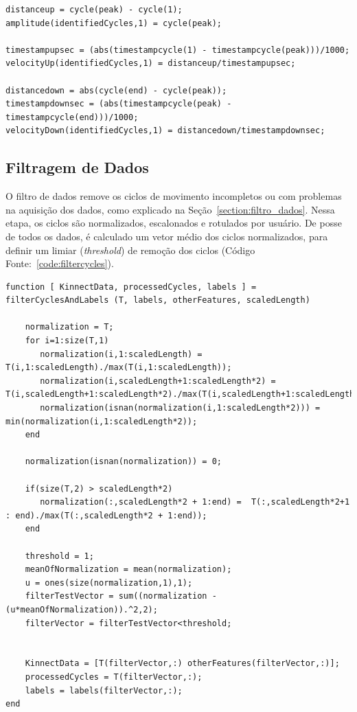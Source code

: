 \begin{lstlisting}[frame=single, caption=Calcular Velociodade Angular Adução e Abdução, label=lst:angular_velocity]	
distanceup = cycle(peak) - cycle(1);
amplitude(identifiedCycles,1) = cycle(peak);
    
timestampupsec = (abs(timestampcycle(1) - timestampcycle(peak)))/1000;
velocityUp(identifiedCycles,1) = distanceup/timestampupsec;

distancedown = abs(cycle(end) - cycle(peak));
timestampdownsec = (abs(timestampcycle(peak) - timestampcycle(end)))/1000;
velocityDown(identifiedCycles,1) = distancedown/timestampdownsec;
\end{lstlisting}	
		
\subsection{Filtragem de Dados}
O filtro de dados remove os ciclos de movimento incompletos ou com problemas na aquisição dos dados, como explicado na Seção~\ref{section:filtro_dados}. Nessa etapa, os ciclos são normalizados, escalonados e rotulados por usuário. 
De posse de todos os dados, é calculado um vetor médio dos ciclos normalizados, para definir um limiar (\textit{threshold}) de remoção dos ciclos (Código Fonte:~\ref{code:filtercycles}).

	\begin{lstlisting}[frame=single, caption=Calcular Velociodade Angular Adução e Abdução, label=code:filtercycles]
function [ KinnectData, processedCycles, labels ] = filterCyclesAndLabels (T, labels, otherFeatures, scaledLength)

    normalization = T;
    for i=1:size(T,1)
       normalization(i,1:scaledLength) = T(i,1:scaledLength)./max(T(i,1:scaledLength));
       normalization(i,scaledLength+1:scaledLength*2) = T(i,scaledLength+1:scaledLength*2)./max(T(i,scaledLength+1:scaledLength*2));
       normalization(isnan(normalization(i,1:scaledLength*2))) = min(normalization(i,1:scaledLength*2));
    end
    
    normalization(isnan(normalization)) = 0;
    
    if(size(T,2) > scaledLength*2) 
       normalization(:,scaledLength*2 + 1:end) =  T(:,scaledLength*2+1 : end)./max(T(:,scaledLength*2 + 1:end));
    end
    
    threshold = 1;
    meanOfNormalization = mean(normalization);
    u = ones(size(normalization,1),1);
    filterTestVector = sum((normalization - (u*meanOfNormalization)).^2,2);
    filterVector = filterTestVector<threshold;
    
       
    KinnectData = [T(filterVector,:) otherFeatures(filterVector,:)];
    processedCycles = T(filterVector,:);
    labels = labels(filterVector,:);    
end
\end{lstlisting}	


